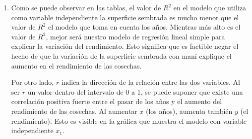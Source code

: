 \documentclass[spanish,12pt,a4paper]{article}
\begin{document}
\begin{enumerate}[label=\alph*)]
\begin{table}[H]
\begin{adjustbox}{max width=\textwidth}
\begin{tabular}{|l|l|l|}
			\end{tabular}
			\egroup
			\end{adjustbox}
		\end{table}
		\begin{figure}[H]
		\centering 
		\label{fig:tiempo}
		\end{figure}\clearpage
		\item Como se puede observar en las tablas, el valor de $R^2$ en el modelo que utiliza como variable independiente la superficie sembrada es mucho menor que el valor de $R^2$ el modelo que toma en cuenta los años. Mientras más alto es el valor de $R^2$, mejor será nuestro modelo de regresión lineal simple para explicar la variación del rendimiento. Esto significa que es factible negar el hecho de que la variación de la superficie sembrada con maní explique el aumento en el rendimiento de las cosechas.
		
		Por otro lado, $r$ indica la dirección de la relación entre las dos variables. Al ser $r$ un valor dentro del intervalo de 0 a 1, se puede suponer que existe una correlación positiva fuerte entre el pasar de los años y el aumento del rendimiento de las cosechas. Al aumentar $x$ (los años), aumenta también $y$ (el rendimiento). Esto es visible en la gráfica que muestra el modelo con variable independiente $x_1$.
		

\end{enumerate}
\end{document}
